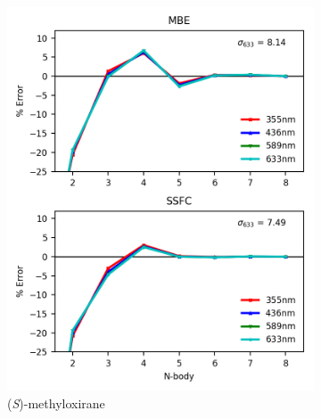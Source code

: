         \begin{figure}
            \begin{subfigure}{0.5\textwidth}
                \centering 
                \includegraphics[scale=0.75]{p1/graphs/metox_7_b3_rot.png}
                \caption{(\textit{S})-methyloxirane}
                \label{metox_7_rot}
            \end{subfigure}%
            \begin{subfigure}{0.5\textwidth}
                \centering

\end{subfigure}
\end{figure}
